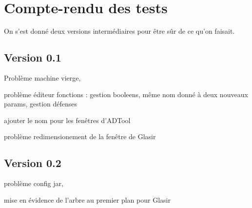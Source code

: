 \section{Compte-rendu des tests}

On s'est donné deux versions intermédiaires pour être sûr de ce qu'on faisait.
\subsection{Version 0.1}

Problème machine vierge, 

problème éditeur fonctions : gestion booleens, même nom donné à deux nouveaux params, gestion défenses

ajouter le nom pour les fenêtres d'ADTool

problème redimensionement de la fenêtre de Glasir 

\subsection{Version 0.2}

problème config jar, 

mise en évidence de l'arbre au premier plan pour Glasir

